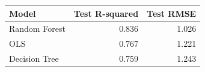 \begin{tabular}{lrr}
\toprule
Model & Test R-squared & Test RMSE
\\
\midrule
Random Forest & 0.836 & 1.026
\\
OLS & 0.767 & 1.221
\\
Decision Tree & 0.759 & 1.243
\\
\bottomrule
\end{tabular}
